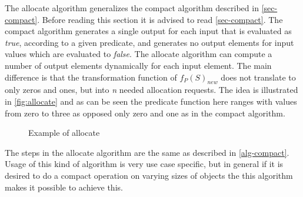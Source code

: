 The allocate algorithm generalizes the compact algorithm described in \autoref{sec-compact}.
Before reading this section it is advised to read \autoref{sec-compact}.
The compact algorithm generates a single output for each input that is evaluated as \textit{true}, according to a given predicate, and generates no output elements for input values which are evaluated to \textit{false}.
The allocate algorithm can compute a number of output elements dynamically for each input element.
The main difference is that the transformation function of $f_{P}(S)_{new}$ does not translate to only zeros and ones, but into \textit{n} needed allocation requests.
The idea is illustrated in \autoref{fig:allocate} and as can be seen the predicate function here ranges with values from zero to three as opposed only zero and one as in the compact algorithm.
\begin{figure}[ht]
	\centering
	\caption{Example of allocate}
	\label{fig:allocate}
\end{figure}
The steps in the allocate algorithm are the same as described in \autoref{alg-compact}.
Usage of this kind of algorithm is very use case specific, but in general if it is desired to do a compact operation on varying sizes of objects the this algorithm makes it possible to achieve this.

